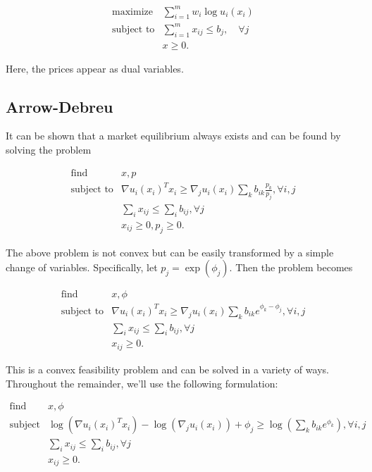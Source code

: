 \documentclass[12pt]{article}
\begin{document}
\[
\begin{array}{ll}
\mbox{maximize} & \sum_{i=1}^m w_i \log u_i(x_i) \\
\mbox{subject to} & \sum_{i=1}^m x_{ij} \leq b_j, \quad \forall j\\
& x \geq 0.
\end{array}
\]

Here, the prices appear as dual variables.

\subsection{Arrow-Debreu}
It can be shown that a market equilibrium always exists and can be found by
solving the problem

\[
\begin{array}{ll}
\mbox{find} & x, p \\
\mbox{subject to} & \nabla u_i(x_i)^T x_i \geq  \nabla_j u_i(x_i) \sum_k b_{ik} \frac{p_k}{p_j}, \forall i,j\\
& \sum_i x_{ij} \leq \sum_i b_{ij}, \forall j\\
& x_{ij} \geq 0, p_j \geq 0.
\end{array}
\]


The above problem is not convex but can be easily transformed by a
simple change of variables. Specifically, let $p_j = \exp(\phi_j)$.
Then the problem becomes

\[
\begin{array}{ll}
\mbox{find} & x, \phi \\
\mbox{subject to} & \nabla u_i(x_i)^T x_i \geq  \nabla_j u_i(x_i) \sum_k b_{ik} e^{\phi_k - \phi_j}, \forall i,j\\
& \sum_i x_{ij} \leq \sum_i b_{ij}, \forall j\\
& x_{ij} \geq 0.
\end{array}
\]

This is a convex feasibility problem and can be solved in a variety of ways.
Throughout the remainder, we'll use the following formulation:

\[
\begin{array}{ll}
\mbox{find} & x, \phi \\
\mbox{subject to} & \log(\nabla u_i(x_i)^T x_i) - \log(\nabla_j u_i(x_i)) + \phi_j 
\geq \log(\sum_k b_{ik} e^{\phi_k}), \forall i,j\\
& \sum_i x_{ij} \leq \sum_i b_{ij}, \forall j\\
& x_{ij} \geq 0.
\end{array}
\]
\end{document}
